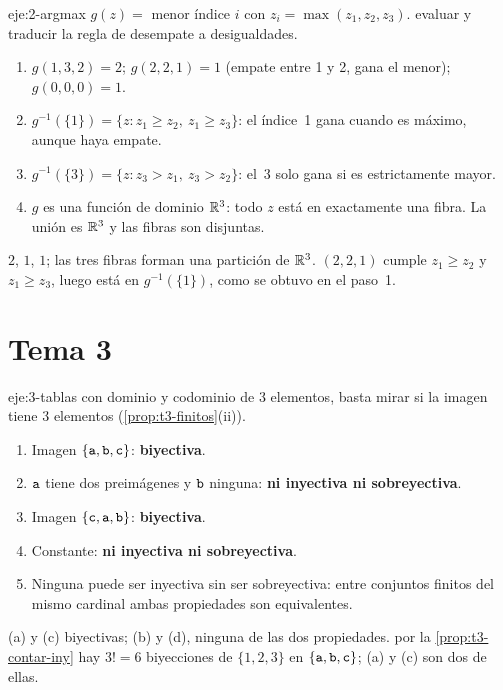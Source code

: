 \begin{solucion}{eje:2-argmax}
\datos $g(z)=$ menor índice $i$ con $z_i=\max(z_1,z_2,z_3)$.
\planteamiento evaluar y traducir la regla de desempate a desigualdades.
\pasos
\begin{enumerate}[label=\arabic*.]
  \item $g(1,3,2)=2$; $g(2,2,1)=1$ (empate entre 1 y 2, gana el menor); $g(0,0,0)=1$.
  \item $g^{-1}(\{1\})=\{z: z_1\ge z_2,\ z_1\ge z_3\}$: el índice~1 gana cuando es máximo, aunque haya empate.
  \item $g^{-1}(\{3\})=\{z: z_3>z_1,\ z_3>z_2\}$: el~3 solo gana si es estrictamente mayor.
  \item $g$ es una función de dominio $\mathbb{R}^{3}$: todo $z$ está en exactamente una fibra. La unión es $\mathbb{R}^{3}$ y las fibras son disjuntas.
\end{enumerate}
\resultado $2$, $1$, $1$; las tres fibras forman una partición de $\mathbb{R}^{3}$.
\comprobacion $(2,2,1)$ cumple $z_1\ge z_2$ y $z_1\ge z_3$, luego está en $g^{-1}(\{1\})$, como se obtuvo en el paso~1.
\end{solucion}
\section{Tema 3}

\begin{solucion}{eje:3-tablas}
\planteamiento con dominio y codominio de 3 elementos, basta mirar si la imagen tiene 3 elementos (\cref{prop:t3-finitos}(ii)).
\pasos
\begin{enumerate}[label=(\alph*)]
  \item Imagen $\{\texttt{a},\texttt{b},\texttt{c}\}$: \textbf{biyectiva}.
  \item $\texttt{a}$ tiene dos preimágenes y $\texttt{b}$ ninguna: \textbf{ni inyectiva ni sobreyectiva}.
  \item Imagen $\{\texttt{c},\texttt{a},\texttt{b}\}$: \textbf{biyectiva}.
  \item Constante: \textbf{ni inyectiva ni sobreyectiva}.
  \item Ninguna puede ser inyectiva sin ser sobreyectiva: entre conjuntos finitos del mismo cardinal ambas propiedades son equivalentes.
\end{enumerate}
\resultado (a) y (c) biyectivas; (b) y (d), ninguna de las dos propiedades.
\comprobacion por la \cref{prop:t3-contar-iny} hay $3!=6$ biyecciones de $\{1,2,3\}$ en $\{\texttt{a},\texttt{b},\texttt{c}\}$; (a) y (c) son dos de ellas.
\end{solucion}


